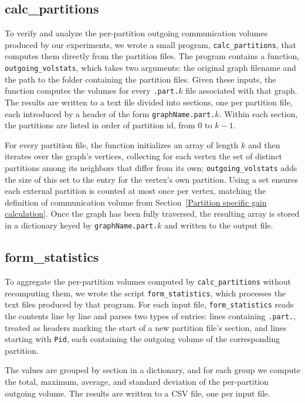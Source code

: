 \subsection{calc\_partitions}
To verify and analyze the per-partition outgoing communication volumes produced by our experiments, we wrote a small program, \texttt{calc\_partitions}, that computes them directly from the partition files. The program contains a function, \texttt{outgoing\_volstats}, which takes two arguments: the original graph filename and the path to the folder containing the partition files. Given these inputs, the function computes the volumes for every \texttt{.part.$k$} file associated with that graph. The results are written to a text file divided into sections, one per partition file, each introduced by a header of the form \texttt{graphName.part.$k$}. Within each section, the partitions are listed in order of partition id, from $0$ to $k-1$.

For every partition file, the function initializes an array of length $k$ and then iterates over the graph's vertices, collecting for each vertex the set of distinct partitions among its neighbors that differ from its own; \texttt{outgoing\_volstats} adds the size of this set to the entry for the vertex's own partition. Using a set ensures each external partition is counted at most once per vertex, matching the definition of communication volume from Section~\ref{Partition specific gain calculation}. Once the graph has been fully traversed, the resulting array is stored in a dictionary keyed by \texttt{graphName.part.$k$} and written to the output file.

\subsection{form\_statistics}
To aggregate the per-partition volumes computed by \texttt{calc\_partitions} without recomputing them, we wrote the script \texttt{form\_statistics}, which processes the text files produced by that program. For each input file, \texttt{form\_statistics} reads the contents line by line and parses two types of entries: lines containing \texttt{.part.}, treated as headers marking the start of a new partition file's section, and lines starting with \texttt{Pid}, each containing the outgoing volume of the corresponding partition. 

The values are grouped by section in a dictionary, and for each group we compute the total, maximum, average, and standard deviation of the per-partition outgoing volume. The results are written to a CSV file, one per input file.

